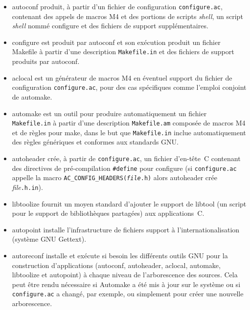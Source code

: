 \documentclass[11pt,a4paper]{article}
\newcommand{\bitem}{\item[$\bullet$]}
\begin{document}
\begin{itemize}

  \bitem \textsf{autoconf} produit, à partir d'un fichier de
  configuration \texttt{configure.ac}, contenant des appels de macros
  \textsf{M4} et des portions de scripts \emph{shell}, un script
  \emph{shell} nommé \textsf{configure} et des fichiers de support
  supplémentaires.

  \bitem \textsf{configure} est produit par \textsf{autoconf} et son
  exécution produit un fichier \textsf{Makefile} à partir d'une
  description \texttt{Makefile.in} et des fichiers de support produits
  par \textsf{autoconf}.

  \bitem \textsf{aclocal} est un générateur de macros \textsf{M4} en
  éventuel support du fichier de configuration \texttt{configure.ac},
  pour des cas spécifiques comme l'emploi conjoint de
  \textsf{automake}.

  \bitem \textsf{automake} est un outil pour produire automatiquement
  un fichier \texttt{Makefile.in} à partir d'une description
  \texttt{Makefile.am} composée de macros \textsf{M4} et de règles
  pour \textsf{make}, dans le but que \texttt{Makefile.in} inclue
  automatiquement des règles génériques et conformes aux standards
  \textsf{GNU}.

  \bitem \textsf{autoheader} crée, à partir de \texttt{configure.ac},
  un fichier d'en-tête~\textsf{C} contenant des directives de
  pré-compilation \verb+#define+ pour \textsf{configure} (si
  \texttt{con\-figure.ac} appelle la macro
  \texttt{AC\_CONFIG\_HEADERS(\textsf{\emph{file}}.h)} alors
  \textsf{autoheader} crée \textsf{\emph{file}}\texttt{.h.in}).

  \bitem \textsf{libtoolize} fournit un moyen standard d'ajouter le
   support de \textsf{libtool} (un script pour le support de
   bibliothèques partagées) aux applications~\textsf{C}.

  \bitem \textsf{autopoint} installe l'infrastructure de fichiers
  support à l'internationalisation (système \textsf{GNU Gettext}).

  \bitem \textsf{autoreconf} installe et exécute si besoin les
  différents outils \textsf{GNU} pour la construction d'applications
  (\textsf{autoconf}, \textsf{autoheader}, \textsf{aclocal},
  \textsf{automake}, \textsf{libtoolize} et \textsf{autopoint}) à
  chaque niveau de l'arborescence des sources. Cela peut être rendu
  nécessaire si \textsf{Automake} a été mis à jour sur le système ou
  si \texttt{configure.ac} a changé, par exemple, ou simplement pour
  créer une nouvelle arborescence.


\end{itemize}
\end{document}
